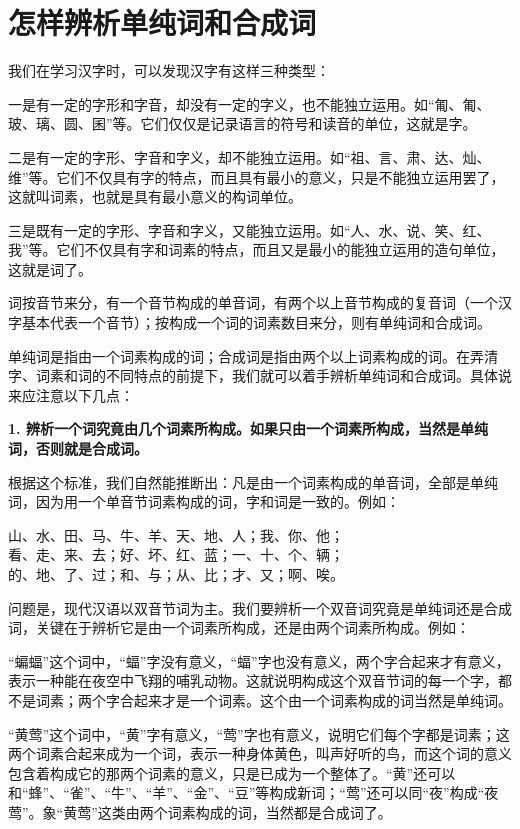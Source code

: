 \section{怎样辨析单纯词和合成词}
我们在学习汉字时，可以发现汉字有这样三种类型：

一是有一定的字形和字音，却没有一定的字义，也不能独立运用。如“匍、匍、玻、璃、圆、囷”等。它们仅仅是记录语言的符号和读音的单位，这就是字。

二是有一定的字形、字音和字义，却不能独立运用。如“祖、言、肃、达、灿、维”等。它们不仅具有字的特点，而且具有最小的意义，只是不能独立运用罢了，这就叫词素，也就是具有最小意义的构词单位。

三是既有一定的字形、字音和字义，又能独立运用。如“人、水、说、笑、红、我”等。它们不仅具有字和词素的特点，而且又是最小的能独立运用的造句单位，这就是词了。

词按音节来分，有一个音节构成的单音词，有两个以上音节构成的复音词（一个汉字基本代表一个音节）；按构成一个词的词素数目来分，则有单纯词和合成词。

单纯词是指由一个词素构成的词；合成词是指由两个以上词素构成的词。在弄清字、词素和词的不同特点的前提下，我们就可以着手辨析单纯词和合成词。具体说来应注意以下几点：

\textbf{1. 辨析一个词究竟由几个词素所构成。如果只由一个词素所构成，当然是单纯词，否则就是合成词。}

根据这个标准，我们自然能推断出：凡是由一个词素构成的单音词，全部是单纯词，因为用一个单音节词素构成的词，字和词是一致的。例如：

山、水、田、马、牛、羊、天、地、人；我、你、他；\\
\indent
看、走、来、去；好、坏、红、蓝；一、十、个、辆；\\
\indent
的、地、了、过；和、与；从、比；才、又；啊、唉。

问题是，现代汉语以双音节词为主。我们要辨析一个双音词究竟是单纯词还是合成词，关键在于辨析它是由一个词素所构成，还是由两个词素所构成。例如：

“蝙蝠”这个词中，“蝠”字没有意义，“蝠”字也没有意义，两个字合起来才有意义，表示一种能在夜空中飞翔的哺乳动物。这就说明构成这个双音节词的每一个字，都不是词素；两个字合起来才是一个词素。这个由一个词素构成的词当然是单纯词。

“黄莺”这个词中，“黄”字有意义，“莺”字也有意义，说明它们每个字都是词素；这两个词素合起来成为一个词，表示一种身体黄色，叫声好听的鸟，而这个词的意义包含着构成它的那两个词素的意义，只是已成为一个整体了。“黄”还可以和“蜂”、“雀”、“牛”、“羊”、“金”、“豆”等构成新词；“莺”还可以同“夜”构成“夜莺”。象“黄莺”这类由两个词素构成的词，当然都是合成词了。

